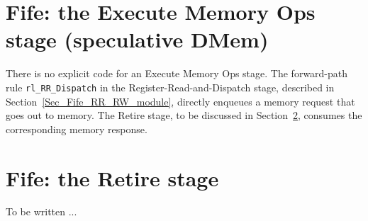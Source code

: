 
\section{Fife: the Execute Memory Ops stage (speculative DMem)}

\label{Sec_Fife_DMem_stage}

There is no explicit code for an Execute Memory Ops stage.  The
forward-path rule \verb|rl_RR_Dispatch| in the
Register-Read-and-Dispatch stage, described in
Section~\ref{Sec_Fife_RR_RW_module}, directly enqueues a memory
request that goes out to memory.  The Retire stage, to be discussed in
Section~\ref{Sec_Fife_Retire_stage}, consumes the corresponding memory
response.


\section{Fife: the Retire stage}

\label{Sec_Fife_Retire_stage}

To be written ...

